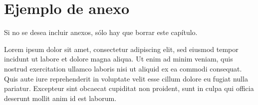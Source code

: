 \appendix
\clearpage
\appendixpage
\addappheadtotoc

\chapter{Ejemplo de anexo}
Si no se desea incluir anexos, sólo hay que borrar este capítulo.
\par
Lorem ipsum dolor sit amet, consectetur adipiscing elit, sed eiusmod tempor
incidunt ut labore et dolore magna aliqua. Ut enim ad minim veniam, quis nostrud exercitation ullamco laboris nisi ut aliquid ex ea commodi consequat. Quis aute iure reprehenderit in voluptate velit esse cillum dolore eu fugiat nulla pariatur. Excepteur sint obcaecat cupiditat non proident, sunt in culpa qui officia deserunt mollit anim id est laborum.\\
